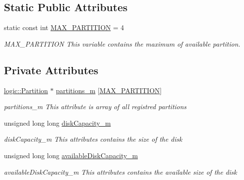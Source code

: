\subsection*{Static Public Attributes}
\begin{DoxyCompactItemize}
\item 
\mbox{\label{classcore_1_1disk_1_1_master_boot_record_a8db81e19979e90b3f826745c9a14288b}} 
static const int \mbox{\hyperlink{classcore_1_1disk_1_1_master_boot_record_a8db81e19979e90b3f826745c9a14288b}{M\+A\+X\+\_\+\+P\+A\+R\+T\+I\+T\+I\+ON}} = 4
\begin{DoxyCompactList}\small\item\em M\+A\+X\+\_\+\+P\+A\+R\+T\+I\+T\+I\+ON This variable contains the maximum of available partition. \end{DoxyCompactList}\end{DoxyCompactItemize}
\subsection*{Private Attributes}
\begin{DoxyCompactItemize}
\item 
\mbox{\label{classcore_1_1disk_1_1_master_boot_record_ab332516409a1180967132f0a5249e3e6}} 
\mbox{\hyperlink{classcore_1_1logic_1_1_partition}{logic\+::\+Partition}} $\ast$ \mbox{\hyperlink{classcore_1_1disk_1_1_master_boot_record_ab332516409a1180967132f0a5249e3e6}{partitions\+\_\+m}} \mbox{[}\mbox{\hyperlink{classcore_1_1disk_1_1_master_boot_record_a8db81e19979e90b3f826745c9a14288b}{M\+A\+X\+\_\+\+P\+A\+R\+T\+I\+T\+I\+ON}}\mbox{]}
\begin{DoxyCompactList}\small\item\em partitions\+\_\+m This attribute is array of all registred partitions \end{DoxyCompactList}\item 
\mbox{\label{classcore_1_1disk_1_1_master_boot_record_a133c97daafd6f7abd543f99a72744578}} 
unsigned long long \mbox{\hyperlink{classcore_1_1disk_1_1_master_boot_record_a133c97daafd6f7abd543f99a72744578}{disk\+Capacity\+\_\+m}}
\begin{DoxyCompactList}\small\item\em disk\+Capacity\+\_\+m This attributes contains the size of the disk \end{DoxyCompactList}\item 
\mbox{\label{classcore_1_1disk_1_1_master_boot_record_a1e70503a01c4c4511050ca8e5173c43e}} 
unsigned long long \mbox{\hyperlink{classcore_1_1disk_1_1_master_boot_record_a1e70503a01c4c4511050ca8e5173c43e}{available\+Disk\+Capacity\+\_\+m}}
\begin{DoxyCompactList}\small\item\em available\+Disk\+Capacity\+\_\+m This attributes contains the available size of the disk \end{DoxyCompactList}\end{DoxyCompactItemize}
